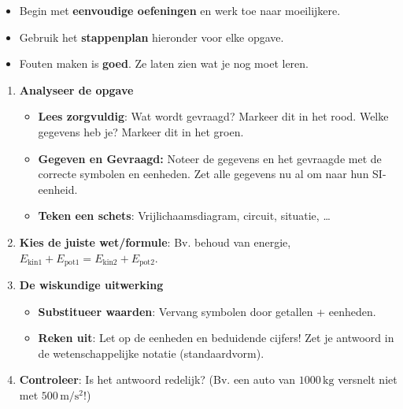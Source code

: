 \documentclass{ximera}
\begin{document}
\begin{itemize}
    \item Begin met \textbf{eenvoudige oefeningen} en werk toe naar moeilijkere.
    \item Gebruik het \textbf{stappenplan} hieronder voor elke opgave.
    \item Fouten maken is \textbf{goed}. Ze laten zien wat je nog moet leren.
\end{itemize}

\begin{algorithm}[foldable=true,title={Stappenplan voor fysica-problemen}]\nl
\begin{enumerate}%
    \item \textbf{Analyseer de opgave} \begin{itemize}
      \item \textbf{Lees zorgvuldig}: Wat wordt gevraagd? Markeer dit in het rood. Welke gegevens heb je? Markeer dit in het groen.
      \item \textbf{Gegeven en Gevraagd:} Noteer de gegevens en het gevraagde met de correcte symbolen en eenheden. Zet alle gegevens nu al om naar hun SI-eenheid.
      \item \textbf{Teken een schets}: Vrijlichaamsdiagram, circuit, situatie, \dots
    \end{itemize}
    \item \textbf{Kies de juiste wet/formule}: Bv. behoud van energie, \(E_\text{kin1} + E_\text{pot1} = E_\text{kin2} + E_\text{pot2}\).
    \item \textbf{De wiskundige uitwerking} \begin{itemize}
      \item \textbf{Substitueer waarden}: Vervang symbolen door getallen + eenheden.
      \item \textbf{Reken uit}: Let op de eenheden en beduidende cijfers! Zet je antwoord in de wetenschappelijke notatie (standaardvorm).
  \end{itemize}
      \item \textbf{Controleer}: Is het antwoord redelijk? (Bv. een auto van $1000 \mathrm{\, kg}$ versnelt niet met $500 \mathrm{\, m/s^2}$!)
\end{enumerate}
\end{algorithm}
\end{document}
